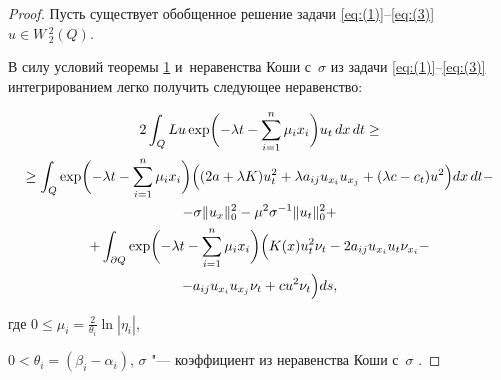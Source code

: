 \begin{proof}

Пусть существует обобщенное решение задачи \eqref{eq:(1)}--\eqref{eq:(3)} $u\in W\,_{2}^{2}(Q)$.  

В силу условий  теоремы \hyperlink{dzh:th1}{1} и~неравенства Коши с~$\sigma $ \cite{dzhamalov:10} из задачи \eqref{eq:(1)}--\eqref{eq:(3)} интегрированием  легко получить следующее неравенство:

\begin{multline}

2\int _{Q} 

Lu  \exp \biggl(-\lambda t-\sum\limits_{i=1}^{n} \mu _i x_i \biggr)

u_t \, dx \, dt

\ge 

\\ 

\ge

\int _{Q} 

\exp \biggl(-\lambda t-\sum\limits_{i=1}^{n} \mu _i x_i \biggr) 

\Bigl( 

(2a+\lambda K)  u_t^2+ \lambda a_{ij} u_{x_i} u_{x_j}+ 

(\lambda c- c_t) u^2 \Bigr) dx\,dt- 

\\

-

\sigma \| u_x\|_{0}^{2}-{{\mu }^{2}}{{\sigma }^{-1}} \| {{u}_{t}} \|_{0}^{2}+ \\

+\int _{\partial Q} 

\exp \biggl(

-\lambda t-\sum _{i=1}^{n} \mu _i x_i \biggr)

\Bigl( 

K(x)u _{t}^{2} {{\nu }_{t}}-2{{a}_{ij}} {{u}_{{{x}_{i}}}} {{u}_{t}} {{\nu }_{{{x}_{i}}}} -\\ -{{a}_{ij}}{{u}_{{{x}_{i}}}}{{u}_{{{x}_{j}}}} {{\nu }_{t}}+c{{u}^{2}} {{\nu }_{t}} \Bigr)

ds, 

\label{eq:(4)}

\end{multline}

где $0\le {{\mu }_{i}}=\frac{2}{{{\theta }_{i}}}\ln | {{\eta }_{i}} |$,

$ 0<{{\theta }_{i}}=({{\beta }_{i}}-{{\alpha }_{i}})$,  $\sigma $ "--- коэффициент из неравенства Коши с~$\sigma $  \cite{dzhamalov:10}.  


\end{proof}
